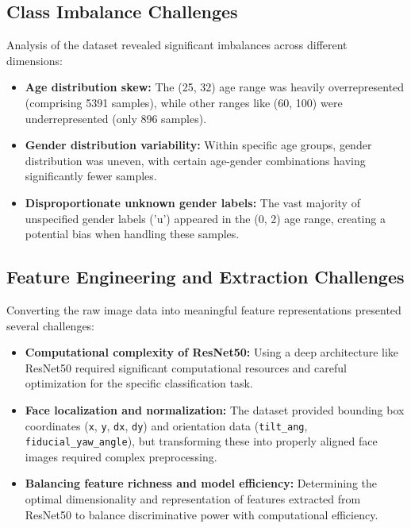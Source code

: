 \documentclass{article}
\begin{document}
\subsection{Class Imbalance Challenges}
Analysis of the dataset revealed significant imbalances across different dimensions:

\begin{itemize}
    \item \textbf{Age distribution skew:} The (25, 32) age range was heavily overrepresented (comprising 5391 samples), while other ranges like (60, 100) were underrepresented (only 896 samples).

    \item \textbf{Gender distribution variability:} Within specific age groups, gender distribution was uneven, with certain age-gender combinations having significantly fewer samples.

    \item \textbf{Disproportionate unknown gender labels:} The vast majority of unspecified gender labels ('u') appeared in the (0, 2) age range, creating a potential bias when handling these samples.
\end{itemize}

\subsection{Feature Engineering and Extraction Challenges}
Converting the raw image data into meaningful feature representations presented several challenges:

\begin{itemize}
    \item \textbf{Computational complexity of ResNet50:} Using a deep architecture like ResNet50 required significant computational resources and careful optimization for the specific classification task.

    \item \textbf{Face localization and normalization:} The dataset provided bounding box coordinates (\texttt{x}, \texttt{y}, \texttt{dx}, \texttt{dy}) and orientation data (\texttt{tilt\_ang}, \texttt{fiducial\_yaw\_angle}), but transforming these into properly aligned face images required complex preprocessing.

    \item \textbf{Balancing feature richness and model efficiency:} Determining the optimal dimensionality and representation of features extracted from ResNet50 to balance discriminative power with computational efficiency.
\end{itemize}
\end{document}
